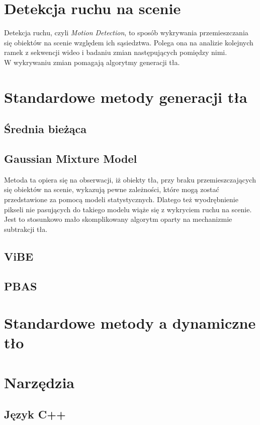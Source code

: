 \section{Detekcja ruchu na scenie}
Detekcja ruchu, czyli \textit{Motion Detection}, to sposób wykrywania przemieszczania się obiektów na scenie względem ich sąsiedztwa. Polega ona na analizie kolejnych ramek z sekwencji wideo i badaniu zmian następujących pomiędzy nimi.\\
W wykrywaniu zmian pomagają algorytmy generacji tła.
\section{Standardowe metody generacji tła}
\subsection{Średnia bieżąca}
\cite{collins2003mean}
\subsection{Gaussian Mixture Model}
\label{sec:GMM}
Metoda ta \cite{zivkovic2004improved} opiera się na obserwacji, iż obiekty tła, przy braku przemieszczających się obiektów na scenie, wykazują pewne zależności, które mogą zostać przedstawione za pomocą modeli statystycznych. Dlatego też wyodrębnienie pikseli nie pasujących do takiego modelu wiąże się z wykryciem ruchu na scenie. Jest to stosunkowo mało skomplikowany algorytm oparty na mechanizmie subtrakcji tła.
\subsection{ViBE}
\cite{barnich2011vibe}
\subsection{PBAS}
\cite{hofmann2012background}
\section{Standardowe metody a dynamiczne tło}
\section{Narzędzia}
\subsection{Język C++}
